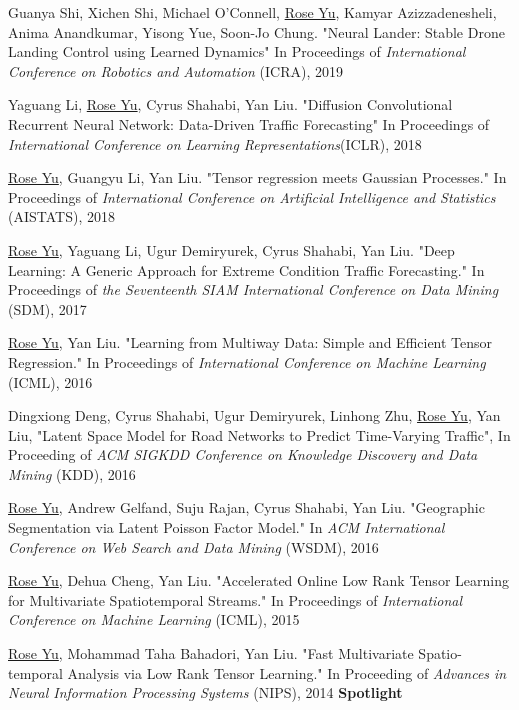 \documentclass[margin,line]{res}
\begin{document}
\begin{resume}
\begin{enumerate}[label={[C\arabic*]}]
\item Guanya Shi, Xichen Shi, Michael O'Connell, \underline{Rose Yu}, Kamyar Azizzadenesheli, Anima Anandkumar, Yisong Yue, Soon-Jo Chung. "Neural Lander: Stable Drone Landing Control using Learned Dynamics" In  Proceedings  of \textit{ International Conference on Robotics and Automation} (ICRA), 2019

\item 	Yaguang Li,  \underline{Rose Yu}, Cyrus Shahabi, Yan Liu. "Diffusion Convolutional Recurrent Neural Network: Data-Driven Traffic Forecasting" In  Proceedings  of   \textit{International Conference on Learning Representations}(ICLR), 2018 
	
\item  \underline{Rose Yu}, Guangyu Li, Yan Liu. "Tensor regression meets Gaussian Processes." In Proceedings  of   \textit{International Conference on Artificial Intelligence and Statistics} (AISTATS), 2018 

\item \underline{Rose Yu}, Yaguang Li, Ugur Demiryurek, Cyrus Shahabi, Yan Liu. "Deep Learning: A Generic Approach for Extreme Condition Traffic Forecasting." In   Proceedings  of  \textit{the Seventeenth SIAM International Conference on Data Mining }(SDM), 2017

\item \underline{Rose Yu}, Yan Liu. "Learning from Multiway Data: Simple and Efficient Tensor Regression." In Proceedings  of  \textit{International Conference on Machine Learning }(ICML),   2016

\item Dingxiong Deng, Cyrus Shahabi, Ugur Demiryurek, Linhong Zhu,  \underline{Rose Yu}, Yan Liu, 
"Latent Space Model for Road Networks to Predict Time-Varying Traffic", In Proceeding of  \textit{ACM SIGKDD Conference on Knowledge Discovery and Data Mining } (KDD), 2016


\item \underline{Rose Yu}, Andrew Gelfand, Suju Rajan, Cyrus Shahabi, Yan Liu. "Geographic Segmentation via Latent Poisson Factor Model." In \textit{ACM International Conference on Web Search and Data Mining} (WSDM), 2016 

\item \underline{Rose Yu}, Dehua Cheng, Yan Liu. "Accelerated Online Low Rank Tensor Learning for Multivariate Spatiotemporal Streams." In Proceedings  of  \textit{International Conference on Machine Learning} (ICML), 2015

\item \underline{Rose Yu}, Mohammad Taha Bahadori, Yan Liu. "Fast Multivariate Spatio-temporal Analysis via Low Rank Tensor Learning." In Proceeding of  \textit{Advances in Neural Information Processing Systems} (NIPS), 2014 \textbf{Spotlight}


\end{enumerate}
\end{resume}
\end{document}
